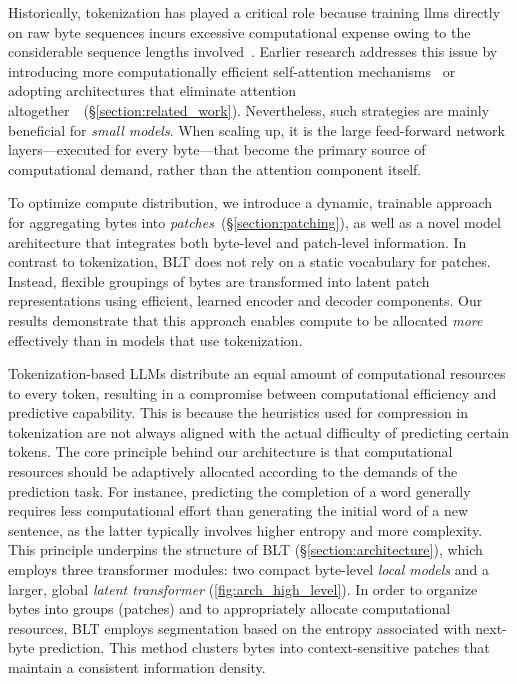 Historically, tokenization has played a critical role because training llms directly on raw byte sequences incurs excessive computational expense owing to the considerable sequence lengths involved~\citep{xue2022byt5}. Earlier research addresses this issue by introducing more computationally efficient self-attention mechanisms~\citep{el2020characterbert, clark2022canine} or adopting architectures that eliminate attention altogether~\citep{wang2024mambabyte}~(\S\ref{section:related_work}). Nevertheless, such strategies are mainly beneficial for \textit{small models}. When scaling up, it is the large feed-forward network layers—executed for every byte—that become the primary source of computational demand, rather than the attention component itself.

To optimize compute distribution, we introduce a dynamic, trainable approach for aggregating bytes into \textit{patches}~(\S\ref{section:patching}), as well as a novel model architecture that integrates both byte-level and patch-level information. In contrast to tokenization, {\textsc BLT} does not rely on a static vocabulary for patches. Instead, flexible groupings of bytes are transformed into latent patch representations using efficient, learned encoder and decoder components. Our results demonstrate that this approach enables compute to be allocated \textit{more} effectively than in models that use tokenization.

Tokenization-based LLMs distribute an equal amount of computational resources to every token, resulting in a compromise between computational efficiency and predictive capability. This is because the heuristics used for compression in tokenization are not always aligned with the actual difficulty of predicting certain tokens. The core principle behind our architecture is that computational resources should be adaptively allocated according to the demands of the prediction task. For instance, predicting the completion of a word generally requires less computational effort than generating the initial word of a new sentence, as the latter typically involves higher entropy and more complexity. This principle underpins the structure of {\textsc BLT} (\S\ref{section:architecture}), which employs three transformer modules: two compact byte-level \textit{local models} and a larger, global \textit{latent transformer} (\autoref{fig:arch_high_level}). In order to organize bytes into groups (patches) and to appropriately allocate computational resources, {\textsc BLT} employs segmentation based on the entropy associated with next-byte prediction. This method clusters bytes into context-sensitive patches that maintain a consistent information density.

